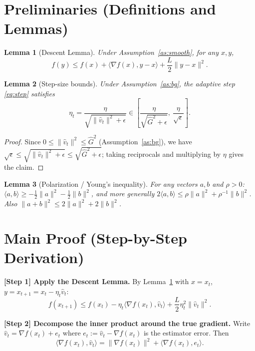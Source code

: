 \documentclass[11pt]{article}
\newtheorem{lemma}{Lemma}
\begin{document}
\section*{Preliminaries (Definitions and Lemmas)}

\begin{lemma}[Descent Lemma]\label{lem:descent}
Under Assumption~\ref{as:smooth}, for any $x,y$,
\[
f(y) \le f(x) + \langle \nabla f(x), y-x\rangle + \frac{L}{2}\|y-x\|^2.
\]
\end{lemma}

\begin{lemma}[Step-size bounds]\label{lem:step}
Under Assumption~\ref{as:bg}, the adaptive step \eqref{eq:step} satisfies
\[
\eta_t = \frac{\eta}{\sqrt{\|\hat v_t\|^2+\epsilon}}
\in \left[\frac{\eta}{\sqrt{\hat G^2+\epsilon}},\ \frac{\eta}{\sqrt{\epsilon}}\right].
\]
\end{lemma}
\begin{proof}
Since $0 \le \|\hat v_t\|^2 \le \hat G^2$ (Assumption~\ref{as:bg}), we have
$\sqrt{\epsilon} \le \sqrt{\|\hat v_t\|^2+\epsilon} \le \sqrt{\hat G^2+\epsilon}$;
taking reciprocals and multiplying by $\eta$ gives the claim.
\end{proof}

\begin{lemma}[Polarization / Young's inequality]\label{lem:young}
For any vectors $a,b$ and $\rho>0$:
$\langle a,b\rangle \ge -\tfrac{1}{2}\|a\|^2 - \tfrac{1}{2}\|b\|^2$, and more generally
$2\langle a,b\rangle \le \rho\|a\|^2 + \rho^{-1}\|b\|^2$. Also
$\|a+b\|^2 \le 2\|a\|^2 + 2\|b\|^2$.
\end{lemma}

\section*{Main Proof (Step-by-Step Derivation)}

\noindent\textbf{[Step 1] Apply the Descent Lemma.}
By Lemma~\ref{lem:descent} with $x=x_t$, $y=x_{t+1}=x_t-\eta_t\hat v_t$:
\[
f(x_{t+1}) \le f(x_t) - \eta_t \langle \nabla f(x_t), \hat v_t\rangle
+ \frac{L}{2}\eta_t^2 \|\hat v_t\|^2.
\tag{S1}
\]

\noindent\textbf{[Step 2] Decompose the inner product around the true gradient.}
Write $\hat v_t = \nabla f(x_t) + e_t$ where $e_t := \hat v_t - \nabla f(x_t)$ is the
estimator error. Then
\[
\langle \nabla f(x_t), \hat v_t\rangle
= \|\nabla f(x_t)\|^2 + \langle \nabla f(x_t), e_t\rangle.
\tag{S2}
\]
\end{document}
